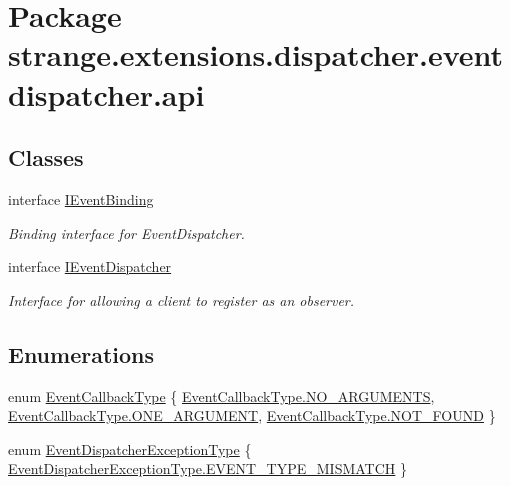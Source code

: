 \hypertarget{namespacestrange_1_1extensions_1_1dispatcher_1_1eventdispatcher_1_1api}{\section{Package strange.\-extensions.\-dispatcher.\-eventdispatcher.\-api}
\label{namespacestrange_1_1extensions_1_1dispatcher_1_1eventdispatcher_1_1api}
}
\subsection*{Classes}
\begin{DoxyCompactItemize}
\item 
interface \hyperlink{interfacestrange_1_1extensions_1_1dispatcher_1_1eventdispatcher_1_1api_1_1_i_event_binding}{I\-Event\-Binding}
\begin{DoxyCompactList}\small\item\em Binding interface for Event\-Dispatcher. \end{DoxyCompactList}\item 
interface \hyperlink{interfacestrange_1_1extensions_1_1dispatcher_1_1eventdispatcher_1_1api_1_1_i_event_dispatcher}{I\-Event\-Dispatcher}
\begin{DoxyCompactList}\small\item\em Interface for allowing a client to register as an observer. \end{DoxyCompactList}\end{DoxyCompactItemize}
\subsection*{Enumerations}
\begin{DoxyCompactItemize}
\item 
enum \hyperlink{namespacestrange_1_1extensions_1_1dispatcher_1_1eventdispatcher_1_1api_a7135cff6e8e84b74fb1aee88c8f5af4c}{Event\-Callback\-Type} \{ \hyperlink{namespacestrange_1_1extensions_1_1dispatcher_1_1eventdispatcher_1_1api_a7135cff6e8e84b74fb1aee88c8f5af4caff382d535c95d1d8c1376594d1bcd9a2}{Event\-Callback\-Type.\-N\-O\-\_\-\-A\-R\-G\-U\-M\-E\-N\-T\-S}, 
\hyperlink{namespacestrange_1_1extensions_1_1dispatcher_1_1eventdispatcher_1_1api_a7135cff6e8e84b74fb1aee88c8f5af4ca6843284a1a144b2248243fe8201b60a9}{Event\-Callback\-Type.\-O\-N\-E\-\_\-\-A\-R\-G\-U\-M\-E\-N\-T}, 
\hyperlink{namespacestrange_1_1extensions_1_1dispatcher_1_1eventdispatcher_1_1api_a7135cff6e8e84b74fb1aee88c8f5af4ca8c02547a8a3b02382bac3557bcb2280d}{Event\-Callback\-Type.\-N\-O\-T\-\_\-\-F\-O\-U\-N\-D}
 \}
\item 
enum \hyperlink{namespacestrange_1_1extensions_1_1dispatcher_1_1eventdispatcher_1_1api_ac82e4192fcc43ba5e64f0469a3c7c06d}{Event\-Dispatcher\-Exception\-Type} \{ \hyperlink{namespacestrange_1_1extensions_1_1dispatcher_1_1eventdispatcher_1_1api_ac82e4192fcc43ba5e64f0469a3c7c06da5ff62c887d3c7f1707f7033db01438fa}{Event\-Dispatcher\-Exception\-Type.\-E\-V\-E\-N\-T\-\_\-\-T\-Y\-P\-E\-\_\-\-M\-I\-S\-M\-A\-T\-C\-H}
 \}
\end{DoxyCompactItemize}
